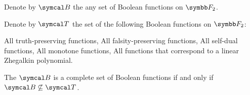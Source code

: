 \begin{theorem}\label{thm:posts_completeness_theorem}\cite{Pelletier1990}
  Denote by \( \Cal{B} \) the any set of Boolean functions on \( \Fld_2 \).

  Denote by \( \Cal{T} \) the set of the following Boolean functions on \( \Fld_2 \):
  \begin{thmenum}
     All truth-preserving functions,
     All falsity-preserving functions,
     All self-dual functions,
     All monotone functions,
     All functions that correspond to a linear Zhegalkin polynomial.
  \end{thmenum}

  The \( \Cal{B} \) is a complete set of Boolean functions if and only if \( \Cal{B} \not\subseteq \Cal{T} \).
\end{theorem}


